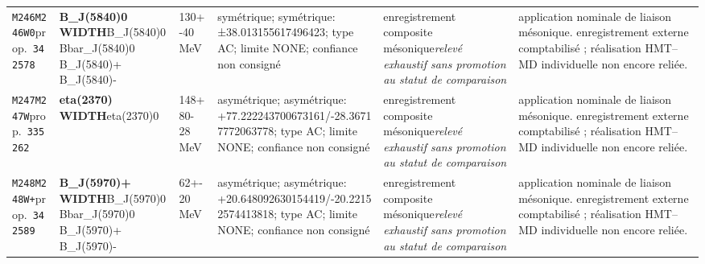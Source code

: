 \begin{landscape}
\begin{longtable}{L{1.85cm}L{4.45cm}L{2.35cm}L{4.05cm}L{3.35cm}L{7.15cm}}
\texttt{M246}\newline \texttt{M246W0}\newline prop.\ \texttt{342578} & \textbf{B\_\allowbreak{}J(5840)0 WIDTH}\newline B\_\allowbreak{}J(5840)0 \textbar{}\allowbreak{} Bbar\_\allowbreak{}J(5840)0 \textbar{}\allowbreak{} B\_\allowbreak{}J(5840)+ \textbar{}\allowbreak{} B\_\allowbreak{}J(5840)- & 130+-40\,MeV & symétrique; symétrique: ±38.013155617496423; type AC; limite NONE; confiance non consigné & enregistrement composite mésonique\newline \emph{relevé exhaustif sans promotion au statut de comparaison} & application nominale de liaison mésonique. enregistrement externe comptabilisé ; réalisation HMT--MD individuelle non encore reliée. \\
\texttt{M247}\newline \texttt{M247W}\newline prop.\ \texttt{335262} & \textbf{eta(2370) WIDTH}\newline eta(2370)0 & 148+80-28\,MeV & asymétrique; asymétrique: +77.222243700673161/-28.36717772063778; type AC; limite NONE; confiance non consigné & enregistrement composite mésonique\newline \emph{relevé exhaustif sans promotion au statut de comparaison} & application nominale de liaison mésonique. enregistrement externe comptabilisé ; réalisation HMT--MD individuelle non encore reliée. \\
\texttt{M248}\newline \texttt{M248W+}\newline prop.\ \texttt{342589} & \textbf{B\_\allowbreak{}J(5970)+ WIDTH}\newline B\_\allowbreak{}J(5970)0 \textbar{}\allowbreak{} Bbar\_\allowbreak{}J(5970)0 \textbar{}\allowbreak{} B\_\allowbreak{}J(5970)+ \textbar{}\allowbreak{} B\_\allowbreak{}J(5970)- & 62+-20\,MeV & asymétrique; asymétrique: +20.648092630154419/-20.22152574413818; type AC; limite NONE; confiance non consigné & enregistrement composite mésonique\newline \emph{relevé exhaustif sans promotion au statut de comparaison} & application nominale de liaison mésonique. enregistrement externe comptabilisé ; réalisation HMT--MD individuelle non encore reliée. \\

\end{longtable}
\end{landscape}
